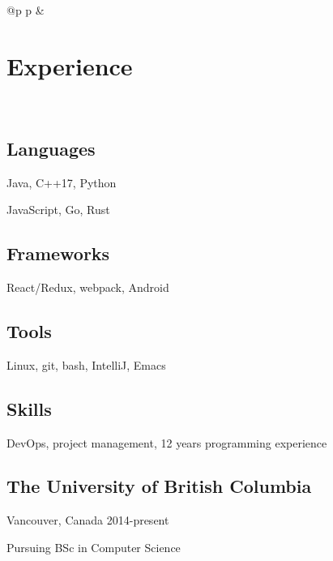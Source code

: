 \documentclass[letterpaper]{article}
\newlength{\rightcolwidth}
\newlength{\leftcolwidth}
\begin{document}
\sffamily
\large
{}
\begin{tabular}{@{}p{\leftcolwidth} p{\rightcolwidth}}
&
\section*{Experience}

\\

\subsection*{Languages}

Java, C++17, Python

JavaScript, Go, Rust

\subsection*{Frameworks}

React/Redux, webpack, Android

\subsection*{Tools}

Linux, git, bash, IntelliJ, Emacs

\subsection*{Skills}

DevOps, project management, 12 years programming experience

\subsection*{The University of \newline British Columbia}

Vancouver, Canada 2014-present

Pursuing BSc in Computer Science


\end{tabular}
\end{document}
